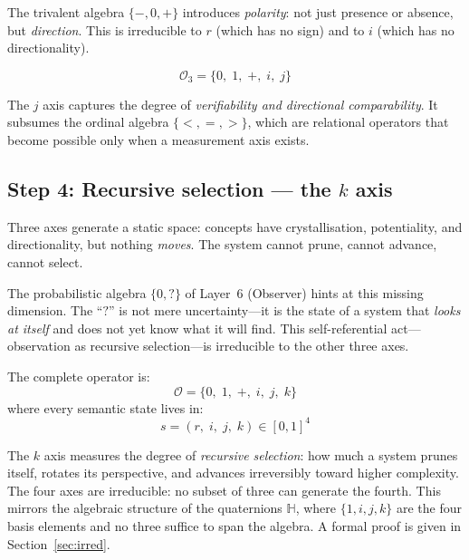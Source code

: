 \documentclass[11pt,a4paper]{article}
\newcommand{\Op}{\mathcal{O}}
\newcommand{\rey}[1]{{\color{rcolor}#1}}
\newcommand{\imag}[1]{{\color{icolor}#1}}
\newcommand{\exac}[1]{{\color{jcolor}#1}}
\newcommand{\recu}[1]{{\color{kcolor}#1}}
\def\rey#1{#1}%
\def\imag#1{#1}%
\def\exac#1{#1}%
\def\recu#1{#1}%
\begin{document}
The trivalent algebra $\{-,0,+\}$ introduces \emph{polarity}: not just
presence or absence, but \emph{direction}. This is irreducible to
$\rey{r}$ (which has no sign) and to $\imag{i}$ (which has no
directionality).

\begin{equation}
\Op_3 = \{0,\; \rey{1},\; \rey{+},\; \imag{i},\; \exac{j}\}
\end{equation}

The $\exac{j}$ axis captures the degree of \emph{verifiability and
directional comparability}. It subsumes the ordinal algebra
$\{<,=,>\}$, which are relational operators that become possible only
when a measurement axis exists.

\subsection{Step 4: Recursive selection --- the \texorpdfstring{$\recu{k}$}{k} axis}

Three axes generate a static space: concepts have crystallisation,
potentiality, and directionality, but nothing \emph{moves}. The system
cannot prune, cannot advance, cannot select.

The probabilistic algebra $\{0,?\}$ of Layer~6 (Observer) hints at this
missing dimension. The ``$?$'' is not mere uncertainty---it is the state
of a system that \emph{looks at itself} and does not yet know what it
will find. This self-referential act---observation as recursive
selection---is irreducible to the other three axes.

The complete operator is:
\begin{equation}
\boxed{\;
\Op = \{0,\; \rey{1},\; \rey{+},\; \imag{i},\; \exac{j},\; \recu{k}\}
\;}
\end{equation}
where every semantic state lives in:
\begin{equation}
s = (\rey{r},\; \imag{i},\; \exac{j},\; \recu{k}) \in [0,1]^4
\end{equation}

The $\recu{k}$ axis measures the degree of \emph{recursive selection}:
how much a system prunes itself, rotates its perspective, and advances
irreversibly toward higher complexity. The four axes are irreducible:
no subset of three can generate the fourth. This mirrors the algebraic
structure of the quaternions $\mathbb{H}$, where $\{1,i,j,k\}$ are
the four basis elements and no three suffice to span the algebra. A
formal proof is given in Section~\ref{sec:irred}.
\end{document}
